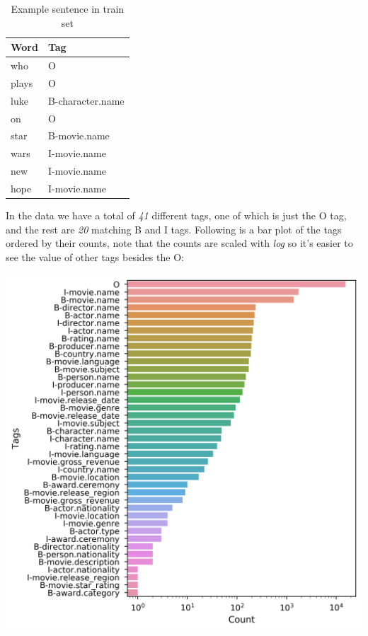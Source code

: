 \documentclass[11pt,a4paper]{article}
\begin{document}
	\begin{table}[h]
		\begin{tabularx}{198pt}{l | l}
			\centering
	 	 	\textbf{Word} & \textbf{Tag} \\
			\hline 
			who & O \\
			plays & O \\
			luke & B-character.name \\
			on & O \\
			star & B-movie.name \\
			wars & I-movie.name \\
			new & I-movie.name \\
			hope & I-movie.name \\
 		\end{tabularx} 
		\caption{Example sentence in train set}
		\label{table:example-sentence}	
	\end{table}

	
	In the data we have a total of \textit{41} different tags, one of which is just the O tag, and the rest are \textit{20} matching B and I tags. Following is a bar plot of the tags ordered by their counts, note that the counts are scaled with \textit{log} so it's easier to see the value of other tags besides the O:
	
	\hspace*{-0.9cm}\includegraphics[scale=0.5]{barplot_iob_tag_counts}
\end{document}
